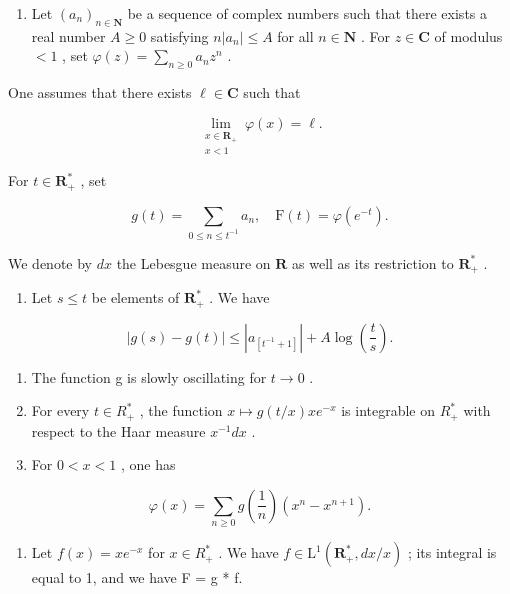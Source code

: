 
\begin{enumerate}
\def\labelenumi{\arabic{enumi})}
\tightlist
\item
  Let \((a_{n})_{n\in \mathbf{N}}\) be a sequence of complex numbers such that there exists a real number \(A\geqslant 0\) satisfying \(n|a_n|\leqslant A\) for all \(n\in \mathbf{N}\) . For \(z\in \mathbf{C}\) of modulus \(<  1\) , set \(\varphi (z) = \sum_{n\geqslant 0}a_nz^n\) .
\end{enumerate}

One assumes that there exists \(\ell \in \mathbf{C}\) such that

\[
\lim_{\substack{x\in \mathbf{R}_{+}\\ x <   1}}\varphi (x) = \ell .
\]

For \(t\in \mathbf{R}_+^*\) , set

\[
g (t) = \sum_ {0 \leqslant n \leqslant t ^ {- 1}} a _ {n}, \quad \mathrm{F} (t) = \varphi (e ^ {- t}).
\]

We denote by \(dx\) the Lebesgue measure on \(\mathbf{R}\) as well as its restriction to \(\mathbf{R}_{+}^{*}\) .

\begin{enumerate}
\def\labelenumi{\alph{enumi})}
\tightlist
\item
  Let \(s \leqslant t\) be elements of \(\mathbf{R}_{+}^{*}\) . We have
\end{enumerate}

\[
| g (s) - g (t) | \leqslant | a _ {[ t ^ {- 1} + 1 ]} | + A \log \left(\frac {t}{s}\right).
\]

\begin{enumerate}
\def\labelenumi{\alph{enumi})}
\setcounter{enumi}{1}
\item
  The function g is slowly oscillating for \(t \rightarrow 0\) .
\item
  For every \(t \in R_{+}^{*}\) , the function \(x \mapsto g(t/x)xe^{-x}\) is integrable on \(R_{+}^{*}\) with respect to the Haar measure \(x^{-1}dx\) .
\item
  For \(0 < x < 1\) , one has
\end{enumerate}

\[
\varphi (x) = \sum_ {n \geqslant 0} g \left(\frac {1}{n}\right) \left(x ^ {n} - x ^ {n + 1}\right).
\]

\begin{enumerate}
\def\labelenumi{\alph{enumi})}
\setcounter{enumi}{4}
\tightlist
\item
  Let \(f(x) = xe^{-x}\) for \(x \in R_{+}^{*}\) . We have \(f \in \mathrm{L}^{1}(\mathbf{R}_{+}^{*}, dx/x)\) ; its integral is equal to 1, and we have F = g * f.
\end{enumerate}


